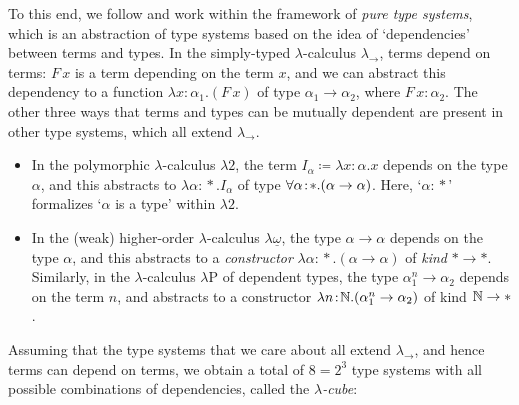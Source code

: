 \documentclass[reqno, twoside]{article}
\begin{document}
    To this end, we follow \cite{Bar91} and work within the framework of \textit{pure type systems}, which is an abstraction of type systems based on the idea of `dependencies' between terms and types. In the simply-typed $\lambda$-calculus $\lambda_\rightarrow$, terms depend on terms: $F\,x$ is a term depending on the term $x$, and we can abstract this dependency to a function $\lambda x\!:\!\alpha_1.(F\,x)$ of type $\alpha_1\rightarrow\alpha_2$, where $F\,x\!:\!\alpha_2$. The other three ways that terms and types can be mutually dependent are present in other type systems, which all extend $\lambda_\rightarrow$.
    \begin{itemize}
        \item In the polymorphic $\lambda$-calculus $\lambda2$, the term $I_\alpha\coloneqq\lambda x\!:\!\alpha.x$ depends on the type $\alpha$, and this abstracts to $\lambda\alpha\!:\!\ast.I_\alpha$ of type $\forall\alpha\!:\!\ast.(\alpha\rightarrow\alpha)$. Here, `$\alpha\!:\!\ast$' formalizes `$\alpha$ is a type' within $\lambda2$.
            \vspace{-0.05in}
        \item In the (weak) higher-order $\lambda$-calculus $\lambda\underline{\omega}$, the type $\alpha\rightarrow\alpha$ depends on the type $\alpha$, and this abstracts to a \textit{constructor} $\lambda\alpha\!:\!\ast.(\alpha\rightarrow\alpha)$ of \textit{kind} $\ast\to\ast$. Similarly, in the $\lambda$-calculus $\lambda\mathrm{P}$ of dependent types, the type $\alpha_1^n\to\alpha_2$ depends on the term $n$, and abstracts to a constructor $\lambda n\!:\!\mathbb{N}.(\alpha_1^n\to\alpha_2)$ of kind $\mathbb{N}\to\ast$.
    \end{itemize}
    Assuming that the type systems that we care about all extend $\lambda_\rightarrow$, and hence terms can depend on terms, we obtain a total of $8=2^3$ type systems with all possible combinations of dependencies, called the \textit{$\lambda$-cube}:
    \vspace{-0.05in}
\end{document}
